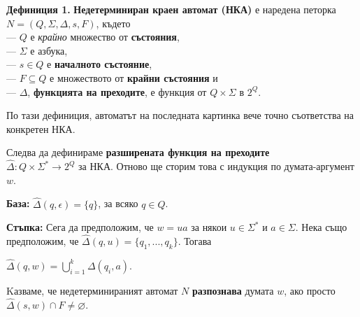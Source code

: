\documentclass[openany]{book}
\begin{document}
        \vspace{15pt}
    
        \textbf{Дефиниция 1.} \textbf{Недетерминиран краен автомат (НКА)} е наредена петорка $N = (Q, \Sigma, \Delta, s, F)$, където \\
        — $Q$ е \textit{крайно} множество от \textbf{състояния}, \\
        — $\Sigma$ е азбука, \\
        — $s \in Q$ е \textbf{началното състояние}, \\
        — $F \subseteq Q$ е множеството от \textbf{крайни състояния} и \\
        — $\Delta$, \textbf{функцията на преходите}, е функция от $Q \times \Sigma$ в $2^Q$.
     
        \vspace{15pt}
    
        По тази дефиниция, автоматът на последната картинка вече точно съответства на 
        конкретен НКА.
        
        \vspace{5pt}
    
        Следва да дефинираме \textbf{разширената функция на преходите} \\ $\hat{\Delta} : Q \times \Sigma^* \rightarrow 2^Q$
        за НКА. Отново ще сторим това с индукция по думата-аргумент $w$.
    
        \vspace{5pt}
    
        \textbf{База:} $\hat{\Delta}(q,\epsilon) = \{q\}$, за всяко $q \in Q$.
    
        \vspace{5pt}
    
        \textbf{Стъпка:} Сега да предположим, че $w = ua$ за някои $u \in \Sigma^*$ и 
        $a \in \Sigma$. Нека също предположим, че $\hat{\Delta}(q,u) = \{q_1,...,q_k\}$. 
        Тогава \\
        \begin{center}
            $\hat{\Delta}(q,w) = \bigcup\limits_{i=1}^k \Delta(q_i,a)$.
        \end{center}
    
        \vspace{5pt}
    
        Kазваме, че недетерминираният автомат $N$ \textbf{разпознава} думата $w$, ако просто
        $\hat{\Delta}(s,w) \cap F \neq \varnothing$.
    
        \vspace{5pt}
    
\end{document}
